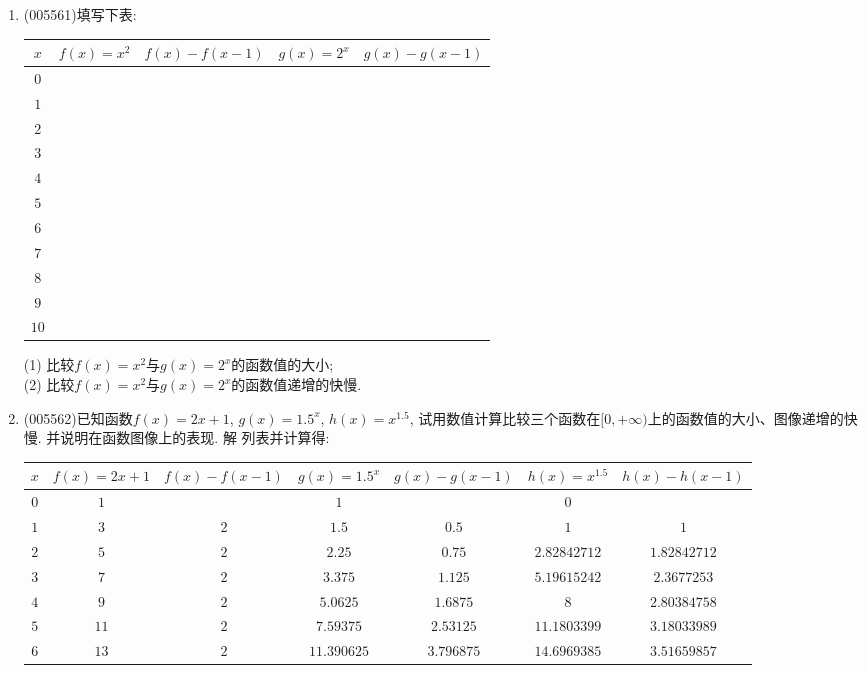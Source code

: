 \documentclass[10pt,a4paper]{article}
\begin{document}
\begin{enumerate}[1.]
\item {\tiny (005561)}填写下表:
\begin{center}
    \begin{tabular}{|c|c|c|c|c|}
        \hline
        $x$	 & $f(x)=x^2$ & $f(x)-f(x-1)$ & $g(x)=2^x$ & $g(x)-g(x-1)$ \\ \hline
        $0$ & & & & \\ \hline
        $1$ & & & & \\ \hline
        $2$ & & & & \\ \hline
        $3$ & & & & \\ \hline
        $4$ & & & & \\ \hline
        $5$ & & & & \\ \hline
        $6$ & & & & \\ \hline
        $7$ & & & & \\ \hline
        $8$ & & & & \\ \hline
        $9$ & & & & \\ \hline
        $10$ & & & & \\ \hline
    \end{tabular}
\end{center}
(1) 比较$f(x)=x^2$与$g(x)=2^x$的函数值的大小;\\
(2) 比较$f(x)=x^2$与$g(x)=2^x$的函数值递增的快慢.
\item {\tiny (005562)}已知函数$f(x)=2x+1$, $g(x)=1.5^x$, $h(x)=x^{1.5}$, 试用数值计算比较三个函数在$[0,+\infty)$上的函数值的大小、图像递增的快慢. 并说明在函数图像上的表现.
解  列表并计算得:
\begin{center}
    \begin{longtable}{|c|c|c|c|c|c|c|}
        \hline
        $x$	 & $f(x)=2x+1$ & $f(x)-f(x-1)$ & $g(x)=1.5^x$ & $g(x)-g(x-1)$ & $h(x)=x^{1.5}$ & $h(x)-h(x-1)$ \\ \hline
        \endhead
        $0$ & $1$ & & $1$ & & $0$ &  \\ \hline
        $1$ & $3$ & $2$ & $1.5$ & $0.5$ & $1$ & $1$\\ \hline
        $2$ & $5$ & $2$ & $2.25$ & $0.75$ & $2.82842712$ & $1.82842712$\\ \hline
        $3$ & $7$ & $2$ & $3.375$ & $1.125$ & $5.19615242$ & $2.3677253$\\ \hline
        $4$ & $9$ & $2$ & $5.0625$ & $1.6875$ & $8$ & $2.80384758$\\ \hline
        $5$ & $11$ & $2$ & $7.59375$ & $2.53125$ & $11.1803399$ & $3.18033989$\\ \hline
        $6$ & $13$ & $2$ & $11.390625$ & $3.796875$ & $14.6969385$ & $3.51659857$\\ \hline

\end{longtable}
\end{center}
\end{enumerate}
\end{document}

